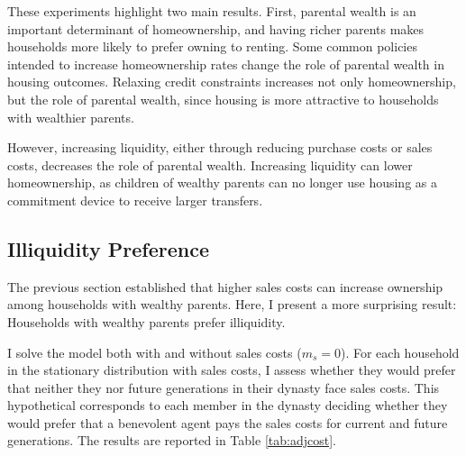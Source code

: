 \documentclass[12pt]{article}
\begin{document}
\begin{table} 
	\centering
\end{table}

These experiments highlight two main results. First, parental wealth is an important determinant of homeownership, and having richer parents makes households more likely to prefer owning to renting. Some common policies intended to increase homeownership rates change the role of parental wealth in housing outcomes. Relaxing credit constraints increases not only homeownership, but the role of parental wealth, since housing is more attractive to households with wealthier parents. 

However, increasing liquidity, either through reducing purchase costs or sales costs, decreases the role of parental wealth. Increasing liquidity can lower homeownership, as children of wealthy parents can no longer use housing as a commitment device to receive larger transfers.

\subsection{Illiquidity Preference}\label{sec:adjcost}
The previous section established that higher sales costs can increase ownership among households with wealthy parents. Here, I present a more surprising result: Households with wealthy parents prefer illiquidity.

I solve the model both with and without sales costs ($m_s=0$). For each household in the stationary distribution with sales costs, I assess whether they would prefer that neither they nor future generations in their dynasty face sales costs. This hypothetical corresponds to each member in the dynasty deciding whether they would prefer that a benevolent agent pays the sales costs for current and future generations. The results are reported in Table \ref{tab:adjcost}.
\end{document}
